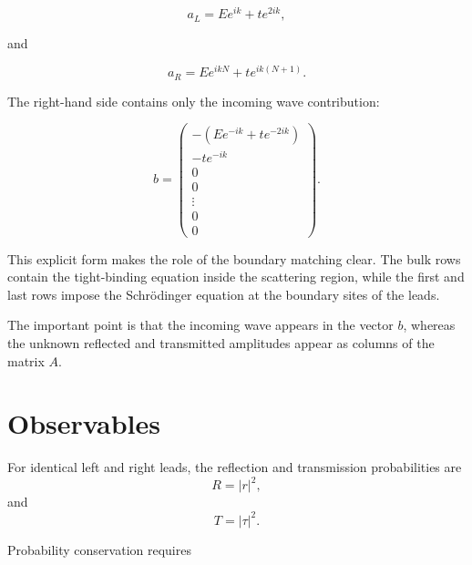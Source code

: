\begin{equation}
	a_L
	=
	E e^{ik}
	+
	t e^{2ik},
\end{equation}

and

\begin{equation}
	a_R
	=
	E e^{ikN}
	+
	t e^{ik(N+1)}.
\end{equation}

The right-hand side contains only the incoming wave contribution:

\begin{equation}
	b
	=
	\begin{pmatrix}
		-\left(Ee^{-ik}+t e^{-2ik}\right) \\
		-t e^{-ik}                        \\
		0                                 \\
		0                                 \\
		\vdots                            \\
		0                                 \\
		0
	\end{pmatrix}.
	\label{eq:explicit-b}
\end{equation}

This explicit form makes the role of the boundary matching clear. The
bulk rows contain the tight-binding equation inside the scattering
region, while the first and last rows impose the Schrödinger equation at
the boundary sites of the leads.

The important point is that the incoming wave appears in the vector $b$,
whereas the unknown reflected and transmitted amplitudes appear as
columns of the matrix $A$.








\section{Observables}

For identical left and right leads, the reflection and transmission
probabilities are
\begin{equation}
	R = |r|^2,
\end{equation}
and
\begin{equation}
	T = |\tau|^2.
\end{equation}

Probability conservation requires

